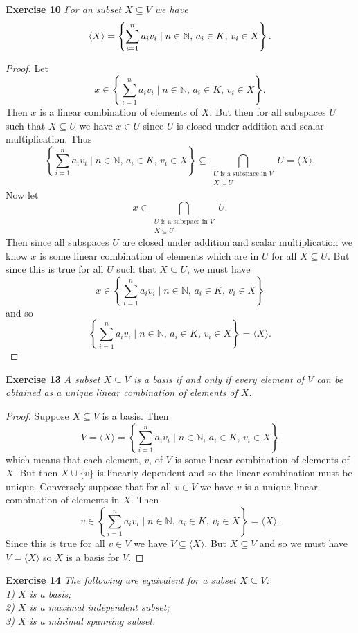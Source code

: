 \documentclass{article}
\begin{document}
\begin{flushleft}
\textbf{Exercise 10}
\textsl{For an subset $X \subseteq V$ we have
\[
\langle X \rangle = \left \{ \sum_{i=1}^n a_i v_i \mid \textup{$n \in \mathbb{N}$, $a_i \in K$, $v_i \in X$} \right \}.
\]}
\begin{proof}
Let
\[
x \in \left \{ \sum_{i=1}^n a_i v_i \mid \text{$n \in \mathbb{N}$, $a_i \in K$, $v_i \in X$} \right \}.
\]
Then $x$ is a linear combination of elements of $X$. But then for all subspaces $U$ such that $X \subseteq U$ we have $x \in U$ since $U$ is closed under addition and scalar multiplication. Thus
\[
\left \{ \sum_{i=1}^n a_i v_i \mid \text{$n \in \mathbb{N}$, $a_i \in K$, $v_i \in X$} \right \} \subseteq \bigcap_{\substack{\text{$U$ is a subspace in $V$} \\ X \subseteq U}} U = \langle X \rangle.
\]
Now let
\[
x \in \bigcap_{\substack{\text{$U$ is a subspace in $V$} \\ X \subseteq U}} U.
\]
Then since all subspaces $U$ are closed under addition and scalar multiplication we know $x$ is some linear combination of elements which are in $U$ for all $X \subseteq U$. But since this is true for all $U$ such that $X \subseteq U$, we must have
\[
x \in \left \{ \sum_{i=1}^n a_i v_i \mid \text{$n \in \mathbb{N}$, $a_i \in K$, $v_i \in X$} \right \}
\]
and so
\[
\left \{ \sum_{i=1}^n a_i v_i \mid \text{$n \in \mathbb{N}$, $a_i \in K$, $v_i \in X$} \right \} = \langle X \rangle.
\]
\end{proof}

\textbf{Exercise 13}
\textsl{A subset $X \subseteq V$ is a basis if and only if every element of $V$ can be obtained as a unique linear combination of elements of $X$.}
\begin{proof}
Suppose $X \subseteq V$ is a basis. Then
\[
V = \langle X \rangle = \left \{ \sum_{i=1}^n a_i v_i \mid \text{$n \in \mathbb{N}$, $a_i \in K$, $v_i \in X$} \right \}
\]
which means that each element, $v$, of $V$ is some linear combination of elements of $X$. But then $X \cup \{v\}$ is linearly dependent and so the linear combination must be unique. Conversely suppose that for all $v \in V$ we have $v$ is a unique linear combination of elements in $X$. Then
\[
v \in \left \{ \sum_{i=1}^n a_i v_i \mid \text{$n \in \mathbb{N}$, $a_i \in K$, $v_i \in X$} \right \} = \langle X \rangle.
\]
Since this is true for all $v \in V$ we have $V \subseteq \langle X \rangle$. But $X \subseteq V$ and so we must have $V = \langle X \rangle$ so $X$ is a basis for $V$.
\end{proof}

\textbf{Exercise 14}
\textsl{The following are equivalent for a subset $X \subseteq V$:\\
1) $X$ is a basis;\\
2) $X$ is a maximal independent subset;\\
3) $X$ is a minimal spanning subset.}


\end{flushleft}
\end{document}
